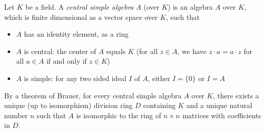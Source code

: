 \documentclass{article}
\begin{document}
Let $K$ be a field. A {\em central simple algebra} $A$ (over $K$) is an algebra $A$ over $K$, which is finite dimensional as a vector space over $K$, such that
\begin{itemize}
\item $A$ has an identity element, as a ring
\item $A$ is central: the center of $A$ equals $K$ (for all $z \in A$, we have $z\cdot a = a \cdot z$ for all $a \in A$ if and only if $z \in K$)
\item $A$ is simple: for any two sided ideal $I$ of $A$, either $I = \{0\}$ or $I = A$
\end{itemize}

By a theorem of Brauer, for every central simple algebra $A$ over $K$, there exists a unique (up to isomorphism) division ring $D$ containing $K$ and a unique natural number $n$ such that $A$ is isomorphic to the ring of $n \times n$ matrices with coefficients in $D$.
\end{document}
